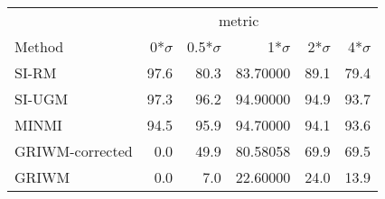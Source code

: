 
\begin{tabular}{lrrrrr}
\toprule
\multicolumn{1}{c}{ } & \multicolumn{4}{c}{metric} \\
\cmidrule(l{3pt}r{3pt}){2-5}
Method & 0*$\sigma$ & 0.5*$\sigma$ & 1*$\sigma$ & 2*$\sigma$ & 4*$\sigma$\\
\midrule
SI-RM & 97.6 & 80.3 & 83.70000 & 89.1 & 79.4\\
SI-UGM & 97.3 & 96.2 & 94.90000 & 94.9 & 93.7\\
MINMI & 94.5 & 95.9 & 94.70000 & 94.1 & 93.6\\
GRIWM-corrected & 0.0 & 49.9 & 80.58058 & 69.9 & 69.5\\
GRIWM & 0.0 & 7.0 & 22.60000 & 24.0 & 13.9\\
\bottomrule
\end{tabular}
